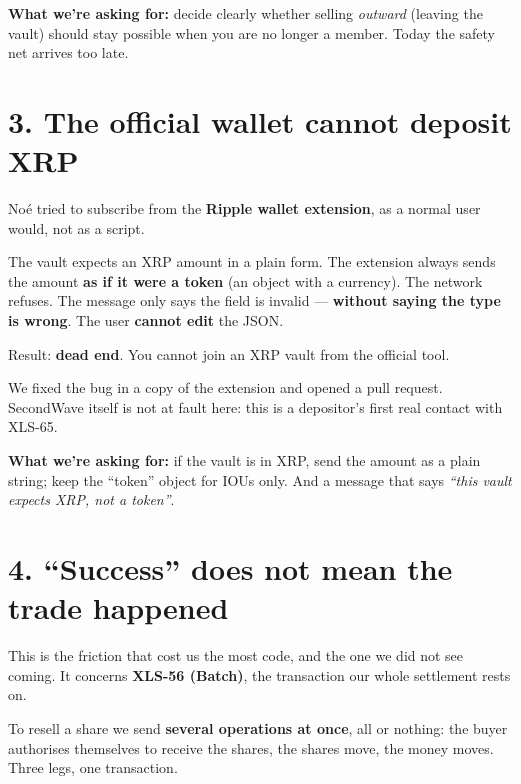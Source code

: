 \documentclass[10pt,a4paper]{article}
\begin{document}
\textbf{What we're asking for:} decide clearly whether selling \emph{outward} (leaving the vault) should stay possible when you are no longer a member. Today the safety net arrives too late.

\vspace{4pt}

\section*{3. The official wallet cannot deposit XRP}

Noé tried to subscribe from the \textbf{Ripple wallet extension}, as a normal user would, not as a script.

The vault expects an XRP amount in a plain form. The extension always sends the amount \textbf{as if it were a token} (an object with a currency). The network refuses. The message only says the field is invalid --- \textbf{without saying the type is wrong}. The user \textbf{cannot edit} the JSON.

Result: \textbf{dead end}. You cannot join an XRP vault from the official tool.

We fixed the bug in a copy of the extension and opened a pull request. SecondWave itself is not at fault here: this is a depositor's first real contact with XLS-65.

\textbf{What we're asking for:} if the vault is in XRP, send the amount as a plain string; keep the ``token'' object for IOUs only. And a message that says \emph{``this vault expects XRP, not a token''}.

\vspace{4pt}

\section*{4. ``Success'' does not mean the trade happened}

This is the friction that cost us the most code, and the one we did not see coming. It concerns \textbf{XLS-56 (Batch)}, the transaction our whole settlement rests on.

To resell a share we send \textbf{several operations at once}, all or nothing: the buyer authorises themselves to receive the shares, the shares move, the money moves. Three legs, one transaction.
\end{document}
